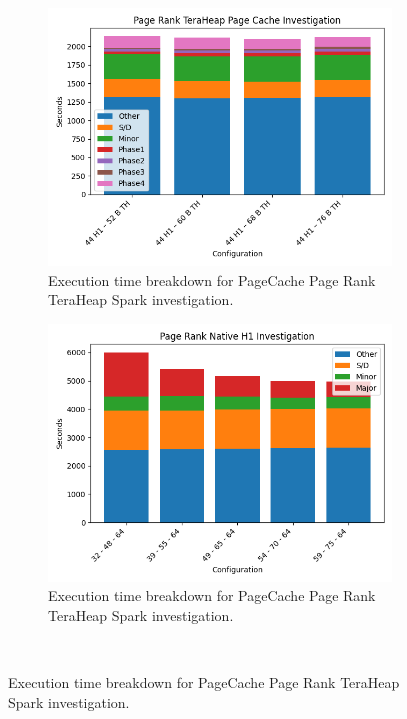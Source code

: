 \begin{figure}[htbp]
\begin{subfigure}[b]{0.48\textwidth}
    \includegraphics[width=\linewidth]{./fig/pr_pc_th.png}
    \caption{Execution time breakdown for PageCache Page Rank TeraHeap
    Spark investigation.}
    \label{fig:pr_pc_th}
\end{subfigure}

\begin{subfigure}[b]{0.48\textwidth}
    \includegraphics[width=\linewidth]{./fig/pr_h1_native.png}
    \caption{Execution time breakdown for PageCache Page Rank TeraHeap
    Spark investigation.}
    \label{fig:pr_h1_native}
\end{subfigure}\\[1em]
\end{figure}

